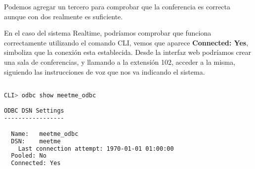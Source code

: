 Podemos agregar un tercero para comprobar que la conferencia es correcta aunque con dos realmente es suficiente.

En el caso del sistema Realtime, podríamos comprobar que funciona correctamente utilizando el comando CLI, vemos que aparece\textbf{ Connected: Yes}, simboliza que la conexión esta establecida. Desde la interfaz web podríamos crear una sala de conferencias, y llamando a la extensión 102, acceder a la misma, siguiendo las instrucciones de voz que nos va indicando el sistema.

\begin{lstlisting}[language=sh]

CLI> odbc show meetme_odbc

ODBC DSN Settings
-----------------

  Name:   meetme_odbc
  DSN:    meetme
    Last connection attempt: 1970-01-01 01:00:00
  Pooled: No
  Connected: Yes

\end{lstlisting}
